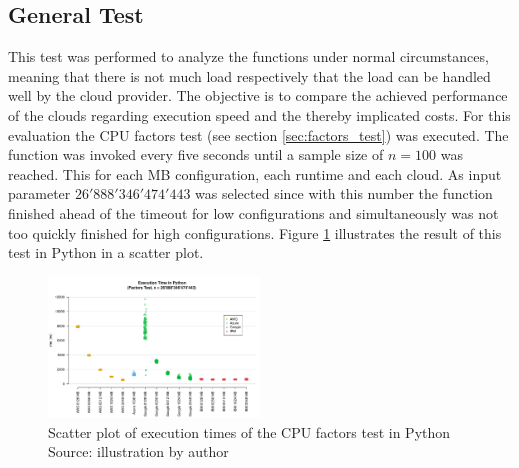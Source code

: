 \subsection{General Test}
\label{sec:general_test}
This test was performed to analyze the functions under normal circumstances, meaning that there is not much load respectively that the load can be handled well by the cloud provider. The objective is to compare the achieved performance of the clouds regarding execution speed and the thereby implicated costs. For this evaluation the \gls{CPU} factors test (see section \ref{sec:factors_test}) was executed. The function was invoked every five seconds until a sample size of $n=100$ was reached. This for each \gls{MB} configuration, each runtime and each cloud. As input parameter $26'888'346'474'443$ was selected since with this number the function finished ahead of the timeout for low configurations and simultaneously was not too quickly finished for high configurations. Figure \ref{fig:general_python_plot} illustrates the result of this test in Python in a scatter plot.
\begin{figure}[htp]
\begin{center}
\includegraphics[width=0.5\textwidth]{bilder/general_python/scatterplot_general_python.pdf}
\captionsetup{justification=centering, labelfont=bf}
\caption[Scatter plot of execution times of the \gls{CPU} factors test in Python]{Scatter plot of execution times of the \gls{CPU} factors test in Python\\ Source: illustration by author}
\label{fig:general_python_plot}
\end{center}
\end{figure}

